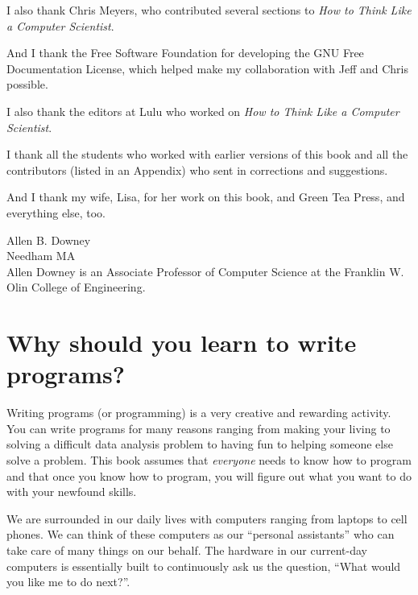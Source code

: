 \documentclass[11pt]{book}
\begin{document}
I also thank Chris Meyers, who contributed several sections
to \emph{How to Think Like a Computer Scientist}.

And I thank the Free Software Foundation for developing
the GNU Free Documentation License, which helped make
my collaboration with Jeff and Chris possible.


I also thank the editors at Lulu who worked on
\emph{How to Think Like a Computer Scientist}.

I thank all the students who worked with earlier
versions of this book and all the contributors (listed
in an Appendix) who sent in corrections and suggestions.

And I thank my wife, Lisa, for her work on this book, and Green
Tea Press, and everything else, too.

Allen B. Downey \\
Needham MA\\

Allen Downey is an Associate Professor of Computer Science at 
the Franklin W. Olin College of Engineering.


\clearemptydoublepage

\begin{latexonly}

\tableofcontents

\clearemptydoublepage

\end{latexonly}

\mainmatter

\chapter{Why should you learn to write programs?}

Writing programs (or programming) is a very creative 
and rewarding activity.  You can write programs for 
many reasons ranging from making your living to solving
a difficult data analysis problem to having fun to helping
someone else solve a problem.  This book assumes that 
\emph{everyone} needs to know how to program and that once 
you know how to program, you will figure out what you want 
to do with your newfound skills.  

We are surrounded in our daily lives with computers ranging 
from laptops to cell phones.  We can think of these computers
as our ``personal assistants'' who can take care of many things
on our behalf.  The hardware in our current-day computers 
is essentially built to continuously ask us the question, 
``What would you like me to do next?''.
\end{document}
